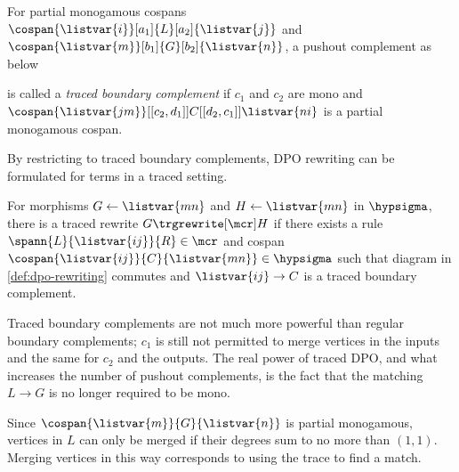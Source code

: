 \begin{definition}
    \label{def:traced-boundary-complement}
    For partial monogamous cospans \(
    \cospan{\listvar{i}}[a_1]{L}[a_2]{\listvar{j}}
    \) and \(
    \cospan{\listvar{m}}[b_1]{G}[b_2]{\listvar{n}}
    \), a pushout complement as below
    \begin{center}
    \end{center}
    is called a \emph{traced boundary complement} if \(c_1\) and \(c_2\) are
    mono and \(
    \cospan{\listvar{jm}}[[c_2,d_1]]{C}[[d_2,c_1]]{\listvar{ni}}
    \) is a partial monogamous cospan.
\end{definition}

By restricting to traced boundary complements, DPO rewriting can be formulated
for terms in a traced setting.

\begin{definition}
    For morphisms \(G \leftarrow \listvar{mn}\) and \(H \leftarrow \listvar{mn}\) in
    \(\hypsigma\), there is a traced rewrite \(G \trgrewrite[\mcr] H\) if there
    exists a rule \(
    \spann{L}{\listvar{ij}}{R} \in \mcr
    \) and cospan \(
    \cospan{\listvar{ij}}{C}{\listvar{mn}} \in \hypsigma
    \) such that diagram in \cref{def:dpo-rewriting} commutes and \(\listvar{ij} \to C\)
    is a traced boundary complement.
\end{definition}

Traced boundary complements are not much more powerful than regular boundary
complements; \(c_1\) is still not permitted to merge vertices in the inputs and
the same for \(c_2\) and the outputs.
The real power of traced DPO, and what increases the number of pushout
complements, is the fact that the matching \(L \to G\) is no longer required to
be mono.

Since \(\cospan{\listvar{m}}{G}{\listvar{n}}\) is partial monogamous, vertices
in \(L\) can only be merged if their degrees sum to no more than \((1,1)\).
Merging vertices in this way corresponds to using the trace to find a match.

